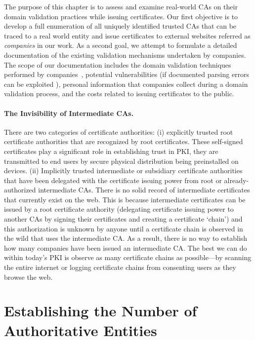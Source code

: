 The purpose of this chapter is to assess and examine real-world CAs on their domain validation practices while issuing certificates. Our first objective is to develop a full enumeration of all uniquely identified trusted CAs that can be traced to a real world entity and issue certificates to external websites referred as \emph{companies} in our work. As a second goal, we attempt to formulate a detailed documentation of the existing validation mechanisms undertaken by companies. The scope of our documentation includes the domain validation techniques performed by companies~\cite{Alternat16:online}, potential vulnerabilities (\eg if documented parsing errors can be exploited \cite{BlackHat94:online}), personal information that companies collect during a domain validation process, and the costs related to issuing certificates to the public.

\paragraph{The Invisibility of Intermediate CAs.} There are two categories of certificate authorities: (i) explicitly trusted root certificate authorities that are recognized by root certificates. These self-signed certificates play a significant role in establishing trust in PKI, they are transmitted to end users by secure physical distribution \ie being preinstalled on devices. (ii) Implicitly trusted intermediate or subsidiary certificate authorities that have been delegated with the certificate issuing power from root or already-authorized intermediate CAs. There is no solid record of intermediate certificates that currently exist on the web. This is because intermediate certificates can be issued by a root certificate authority (delegating certificate issuing power to another CAs by signing their certificates and creating a certificate `chain') and this authorization is unknown by anyone until a certificate chain is observed in the wild that uses the intermediate CA. As a result, there is no way to establish how many companies have been issued an intermediate CA. The best we can do within today's PKI is observe as many certificate chains as possible---\eg by scanning the entire internet or logging certificate chains from consenting users as they browse the web.

\section{Establishing the Number of Authoritative Entities}

